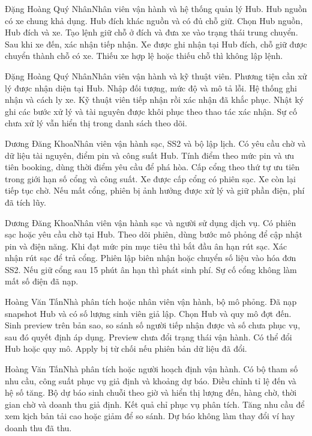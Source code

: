 {Đặng Hoàng Quý Nhân}{Nhân viên vận hành và hệ thống quản lý Hub.}
{Hub nguồn có xe chung khả dụng. Hub đích khác nguồn và có đủ chỗ giữ.}
{Chọn Hub nguồn, Hub đích và xe. Tạo lệnh giữ chỗ ở đích và đưa xe vào trạng thái trung chuyển. Sau khi xe đến, xác nhận tiếp nhận.}
{Xe được ghi nhận tại Hub đích, chỗ giữ được chuyển thành chỗ có xe. Thiếu xe hợp lệ hoặc thiếu chỗ thì không lập lệnh.}

{Đặng Hoàng Quý Nhân}{Nhân viên vận hành và kỹ thuật viên.}
{Phương tiện cần xử lý được nhận diện tại Hub.}
{Nhập đối tượng, mức độ và mô tả lỗi. Hệ thống ghi nhận và cách ly xe. Kỹ thuật viên tiếp nhận rồi xác nhận đã khắc phục.}
{Nhật ký ghi các bước xử lý và tài nguyên được khôi phục theo thao tác xác nhận. Sự cố chưa xử lý vẫn hiển thị trong danh sách theo dõi.}

{Dương Đăng Khoa}{Nhân viên vận hành sạc, SS2 và bộ lập lịch.}
{Có yêu cầu chờ và dữ liệu tài nguyên, điểm pin và công suất Hub.}
{Tính điểm theo mức pin và ưu tiên booking, dùng thời điểm yêu cầu để phá hòa. Cấp cổng theo thứ tự ưu tiên trong giới hạn số cổng và công suất.}
{Xe được cấp cổng có phiên sạc. Xe còn lại tiếp tục chờ. Nếu mất cổng, phiên bị ảnh hưởng được xử lý và giữ phần điện, phí đã tích lũy.}

{Dương Đăng Khoa}{Nhân viên vận hành sạc và người sử dụng dịch vụ.}
{Có phiên sạc hoặc yêu cầu chờ tại Hub.}
{Theo dõi phiên, dùng bước mô phỏng để cập nhật pin và điện năng. Khi đạt mức pin mục tiêu thì bắt đầu ân hạn rút sạc. Xác nhận rút sạc để trả cổng.}
{Phiên lập biên nhận hoặc chuyển số liệu vào hóa đơn SS2. Nếu giữ cổng sau 15 phút ân hạn thì phát sinh phí. Sự cố cổng không làm mất số điện đã nạp.}

{Hoàng Văn Tấn}{Nhà phân tích hoặc nhân viên vận hành, bộ mô phỏng.}
{Đã nạp snapshot Hub và có số lượng sinh viên giả lập.}
{Chọn Hub và quy mô đợt đến. Sinh preview trên bản sao, so sánh số người tiếp nhận được và số chưa phục vụ, sau đó quyết định áp dụng.}
{Preview chưa đổi trạng thái vận hành. Có thể đổi Hub hoặc quy mô. Apply bị từ chối nếu phiên bản dữ liệu đã đổi.}

{Hoàng Văn Tấn}{Nhà phân tích hoặc người hoạch định vận hành.}
{Có bộ tham số nhu cầu, công suất phục vụ giả định và khoảng dự báo.}
{Điều chỉnh tỉ lệ đến và hệ số tăng. Bộ dự báo sinh chuỗi theo giờ và hiển thị lượng đến, hàng chờ, thời gian chờ và doanh thu giả định.}
{Kết quả chỉ phục vụ phân tích. Tăng nhu cầu để xem kịch bản tải cao hoặc giảm để so sánh. Dự báo không làm thay đổi ví hay doanh thu đã thu.}

